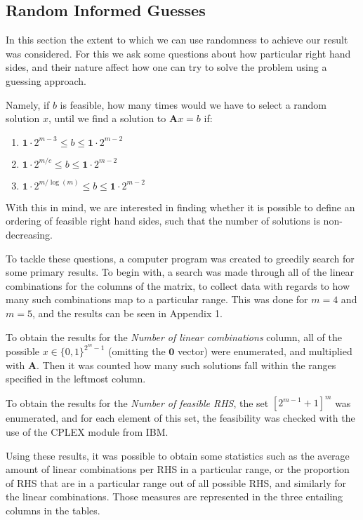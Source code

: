 \documentclass{article}
\begin{document}
\subsection{Random Informed Guesses}
In this section the extent to which we can use randomness to achieve our result was considered. For this we ask some questions about how particular right hand sides, and their nature affect how one can try to solve the problem using a guessing approach.

Namely, if $b$ is feasible, how many times would we have to select a random solution $x$, until we find a solution to $\mathbf{A}x = b$ if:
\begin{enumerate}
    \item $\mathbf{1}\cdot 2^{m-3} \leq b \leq \mathbf{1}\cdot 2^{m-2} $
    \item $\mathbf{1}\cdot 2^{m/c} \leq b \leq \mathbf{1}\cdot 2^{m-2} $
    \item $\mathbf{1}\cdot 2^{m/\log(m)} \leq b \leq \mathbf{1}\cdot 2^{m-2} $
\end{enumerate}
With this in mind, we are interested in finding whether it is possible to define an ordering of feasible right hand sides, such that the number of solutions is non-decreasing. 

To tackle these questions, a computer program was created\footnotemark{} to greedily search for some primary results. To begin with, a search was made through all of the linear combinations for the columns of the matrix, to collect data with regards to how many such combinations map to a particular range. This was done for $m=4$ and $m=5$, and the results can be seen in Appendix 1.

To obtain the results for the \textit{Number of linear combinations} column, all of the possible $x \in \{0,1\}^{2^m - 1}$ (omitting the $\mathbf{0}$ vector) were enumerated, and multiplied with $\mathbf{A}$. Then it was counted how many such solutions fall within the ranges specified in the leftmost column. 

To obtain the results for the \textit{Number of feasible RHS}, the set $\left[2^{m-1}+1\right] ^m$ was enumerated, and for each element of this set, the feasibility was checked with the use of the CPLEX module from IBM. 

Using these results, it was possible to obtain some statistics such as the average amount of linear combinations per RHS in a particular range, or the proportion of RHS that are in a particular range out of all possible RHS, and similarly for the linear combinations. Those measures are represented in the three entailing columns in the tables. 
\end{document}
